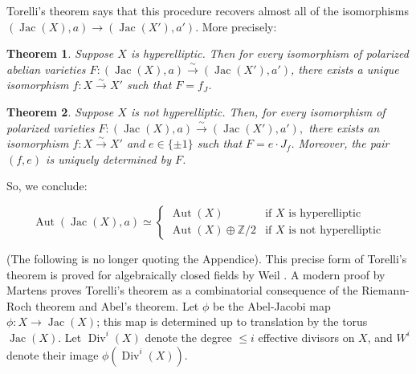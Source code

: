 \documentclass[12pt,reqno]{amsart}
\DeclareMathOperator{\Aut}{Aut}
\DeclareMathOperator{\Jac}{Jac}
\DeclareMathOperator{\Div}{Div}
\newcommand{\Z}{\mathbb{Z}}
\newtheorem*{thm*}{Theorem}
\theoremstyle{definition}
\theoremstyle{remark}
\newtheorem*{remark}{Remark}
\begin{document}



Torelli's theorem says that this procedure recovers almost all of the isomorphisms $(\Jac(X), a) \to (\Jac(X'), a')$. More precisely:

\begin{thm*} Suppose $X$ is hyperelliptic.  Then for every isomorphism of polarized abelian varieties $F: (\operatorname{Jac}(X),a) \stackrel{\sim}{\rightarrow} (\operatorname{Jac}(X'),a')$, there exists a unique isomorphism $f: X \stackrel{\sim}{\rightarrow} X'$ such that $F = f_J$.  \end{thm*}

\begin{thm*} Suppose $X$ is not hyperelliptic.  Then, for every isomorphism of polarized varieties $F: (\operatorname{Jac}(X),a) \stackrel{\sim}{\rightarrow} (\operatorname{Jac}(X'),a'),$ there exists an isomorphism $f: X \stackrel{\sim}{\rightarrow} X'$ and $e \in \{ \pm 1\}$ such that $F = e \cdot  J_f$.  Moreover, the pair $(f,e)$ is uniquely determined by $F$. \end{thm*}

So, we conclude: 

$$\Aut(\Jac(X), a) \simeq \begin{cases} \Aut(X) & \text{if } X \text{ is hyperelliptic} \\
\Aut(X) \oplus \Z/2 &  \text{if } X \text{ is not hyperelliptic}
\end{cases} $$



(The following is no longer quoting the Appendice). This precise form of Torelli's theorem is proved for algebraically closed fields by Weil \cite{oe}. A modern proof by Martens \cite{finn} proves Torelli's theorem as a combinatorial consequence of the Riemann-Roch theorem and Abel's theorem. Let $\phi$ be the Abel-Jacobi map $\phi: X \to \Jac(X)$; this map is determined up to translation by the torus $\Jac(X)$. Let $\Div^i(X)$ denote the degree $\leq i$ effective divisors on $X$, and $W^i$ denote their image $\phi(\Div^i(X))$. 
\end{document}
